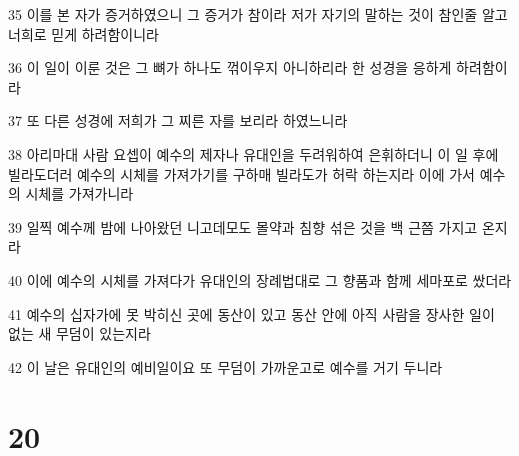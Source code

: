\par 35 이를 본 자가 증거하였으니 그 증거가 참이라 저가 자기의 말하는 것이 참인줄 알고 너희로 믿게 하려함이니라
\par 36 이 일이 이룬 것은 그 뼈가 하나도 꺾이우지 아니하리라 한 성경을 응하게 하려함이라
\par 37 또 다른 성경에 저희가 그 찌른 자를 보리라 하였느니라
\par 38 아리마대 사람 요셉이 예수의 제자나 유대인을 두려워하여 은휘하더니 이 일 후에 빌라도더러 예수의 시체를 가져가기를 구하매 빌라도가 허락 하는지라 이에 가서 예수의 시체를 가져가니라
\par 39 일찍 예수께 밤에 나아왔던 니고데모도 몰약과 침향 섞은 것을 백 근쯤 가지고 온지라
\par 40 이에 예수의 시체를 가져다가 유대인의 장례법대로 그 향품과 함께 세마포로 쌌더라
\par 41 예수의 십자가에 못 박히신 곳에 동산이 있고 동산 안에 아직 사람을 장사한 일이 없는 새 무덤이 있는지라
\par 42 이 날은 유대인의 예비일이요 또 무덤이 가까운고로 예수를 거기 두니라

\chapter{20}


